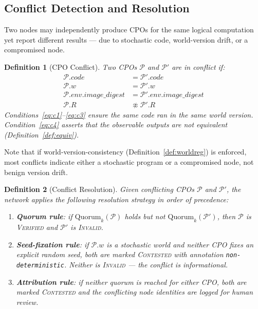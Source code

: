 \documentclass[11pt]{article}
\newtheorem{definition}{Definition}
\begin{document}
\subsection{Conflict Detection and Resolution}
\label{sec:conflict}

Two nodes may independently produce CPOs for the same logical computation
yet report different results — due to stochastic code, world-version drift,
or a compromised node.

\begin{definition}[CPO Conflict]
\label{def:conflict}
Two CPOs $\mathcal{P}$ and $\mathcal{P}'$ are in \emph{conflict} if:
\begin{align}
  \mathcal{P}.\textit{code} &= \mathcal{P}'.\textit{code} \label{eq:c1} \\
  \mathcal{P}.w &= \mathcal{P}'.w \label{eq:c2} \\
  \mathcal{P}.\textit{env}.\textit{image\_digest} &=
    \mathcal{P}'.\textit{env}.\textit{image\_digest} \label{eq:c3} \\
  \mathcal{P}.R &\not\approx \mathcal{P}'.R \label{eq:c4}
\end{align}
Conditions~\eqref{eq:c1}--\eqref{eq:c3} ensure the same code ran in the
same world version.  Condition~\eqref{eq:c4} asserts that the observable
outputs are not equivalent (Definition~\ref{def:equiv}).
\end{definition}

Note that if world-version-consistency (Definition~\ref{def:worldreg}) is
enforced, most conflicts indicate either a stochastic program or a
compromised node, not benign version drift.

\begin{definition}[Conflict Resolution]
\label{def:resolution}
Given conflicting CPOs $\mathcal{P}$ and $\mathcal{P}'$, the network
applies the following resolution strategy in order of precedence:

\begin{enumerate}
  \item \textbf{Quorum rule}: if $\mathrm{Quorum}_k(\mathcal{P})$ holds but
        not $\mathrm{Quorum}_k(\mathcal{P}')$, then $\mathcal{P}$ is
        \textsc{Verified} and $\mathcal{P}'$ is \textsc{Invalid}.
  \item \textbf{Seed-fixation rule}: if $\mathcal{P}.w$ is a stochastic
        world and neither CPO fixes an explicit random seed, both are marked
        \textsc{Contested} with annotation \texttt{non-deterministic}.
        Neither is \textsc{Invalid} — the conflict is informational.
  \item \textbf{Attribution rule}: if neither quorum is reached for either
        CPO, both are marked \textsc{Contested} and the conflicting node
        identities are logged for human review.
\end{enumerate}
\end{definition}
\end{document}

